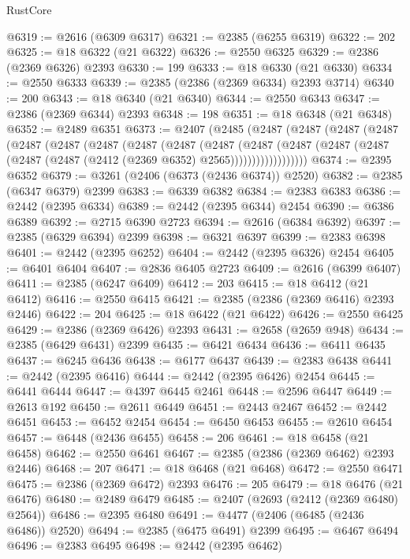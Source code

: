 \begin{lexlean}{RustCore}
\begin{coremodule}
@6319 := @2616 (@6309 @6317)
@6321 := @2385 (@6255 @6319)
@6322 := 202
@6325 := @18 @6322 (@21 @6322)
@6326 := @2550 @6325
@6329 := @2386 (@2369 @6326) @2393
@6330 := 199
@6333 := @18 @6330 (@21 @6330)
@6334 := @2550 @6333
@6339 := @2385 (@2386 (@2369 @6334) @2393 @3714)
@6340 := 200
@6343 := @18 @6340 (@21 @6340)
@6344 := @2550 @6343
@6347 := @2386 (@2369 @6344) @2393
@6348 := 198
@6351 := @18 @6348 (@21 @6348)
@6352 := @2489 @6351
@6373 := @2407
    (@2485
      (@2487
        (@2487
          (@2487
            (@2487
              (@2487
                (@2487
                  (@2487
                    (@2487
                      (@2487
                        (@2487
                          (@2487
                            (@2487
                              (@2487
                                (@2487 (@2487 (@2487 (@2412 (@2369 @6352) @2565))))))))))))))))))
@6374 := @2395 @6352
@6379 := @3261 (@2406 (@6373 (@2436 @6374)) @2520)
@6382 := @2385 (@6347 @6379) @2399
@6383 := @6339 @6382
@6384 := @2383 @6383
@6386 := @2442 (@2395 @6334)
@6389 := @2442 (@2395 @6344) @2454
@6390 := @6386 @6389
@6392 := @2715 @6390 @2723
@6394 := @2616 (@6384 @6392)
@6397 := @2385 (@6329 @6394) @2399
@6398 := @6321 @6397
@6399 := @2383 @6398
@6401 := @2442 (@2395 @6252)
@6404 := @2442 (@2395 @6326) @2454
@6405 := @6401 @6404
@6407 := @2836 @6405 @2723
@6409 := @2616 (@6399 @6407)
@6411 := @2385 (@6247 @6409)
@6412 := 203
@6415 := @18 @6412 (@21 @6412)
@6416 := @2550 @6415
@6421 := @2385 (@2386 (@2369 @6416) @2393 @2446)
@6422 := 204
@6425 := @18 @6422 (@21 @6422)
@6426 := @2550 @6425
@6429 := @2386 (@2369 @6426) @2393
@6431 := @2658 (@2659 @948)
@6434 := @2385 (@6429 @6431) @2399
@6435 := @6421 @6434
@6436 := @6411 @6435
@6437 := @6245 @6436
@6438 := @6177 @6437
@6439 := @2383 @6438
@6441 := @2442 (@2395 @6416)
@6444 := @2442 (@2395 @6426) @2454
@6445 := @6441 @6444
@6447 := @4397 @6445 @2461
@6448 := @2596 @6447
@6449 := @2613 @192
@6450 := @2611 @6449
@6451 := @2443 @2467
@6452 := @2442 @6451
@6453 := @6452 @2454
@6454 := @6450 @6453
@6455 := @2610 @6454
@6457 := @6448 (@2436 @6455)
@6458 := 206
@6461 := @18 @6458 (@21 @6458)
@6462 := @2550 @6461
@6467 := @2385 (@2386 (@2369 @6462) @2393 @2446)
@6468 := 207
@6471 := @18 @6468 (@21 @6468)
@6472 := @2550 @6471
@6475 := @2386 (@2369 @6472) @2393
@6476 := 205
@6479 := @18 @6476 (@21 @6476)
@6480 := @2489 @6479
@6485 := @2407 (@2693 (@2412 (@2369 @6480) @2564))
@6486 := @2395 @6480
@6491 := @4477 (@2406 (@6485 (@2436 @6486)) @2520)
@6494 := @2385 (@6475 @6491) @2399
@6495 := @6467 @6494
@6496 := @2383 @6495
@6498 := @2442 (@2395 @6462)

\end{coremodule}
\end{lexlean}
